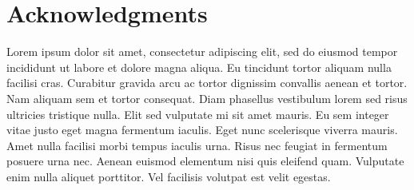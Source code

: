 \chapter*{Acknowledgments}
\label{chap:acknowledgments}

Lorem ipsum dolor sit amet, consectetur adipiscing elit, sed do eiusmod tempor incididunt ut labore et dolore magna aliqua.
Eu tincidunt tortor aliquam nulla facilisi cras.
Curabitur gravida arcu ac tortor dignissim convallis aenean et tortor.
Nam aliquam sem et tortor consequat.
Diam phasellus vestibulum lorem sed risus ultricies tristique nulla.
Elit sed vulputate mi sit amet mauris.
Eu sem integer vitae justo eget magna fermentum iaculis.
Eget nunc scelerisque viverra mauris.
Amet nulla facilisi morbi tempus iaculis urna.
Risus nec feugiat in fermentum posuere urna nec.
Aenean euismod elementum nisi quis eleifend quam.
Vulputate enim nulla aliquet porttitor.
Vel facilisis volutpat est velit egestas.

\thispagestyle{empty}

